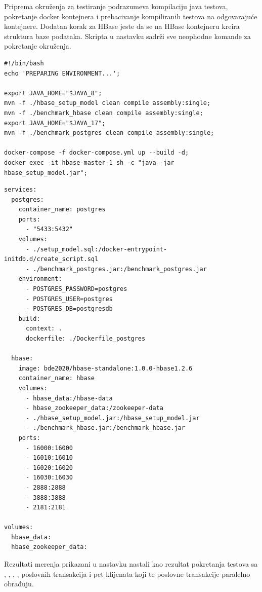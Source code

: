 \documentclass[12pt,oneside]{memoir}
\begin{document}
Priprema okruženja za testiranje podrazumeva kompilaciju java testova, pokretanje docker kontejnera i prebacivanje kompiliranih testova na odgovarajuće kontejnere. Dodatan korak za HBase jeste da se na HBase kontejneru kreira struktura baze podataka. Skripta u nastavku sadrži sve neophodne komande za pokretanje okruženja.

\pagebreak

\begin{lstlisting}[title={prepare-env.sh},captionpos=t]
#!/bin/bash
echo 'PREPARING ENVIRONMENT...';

export JAVA_HOME="$JAVA_8";
mvn -f ./hbase_setup_model clean compile assembly:single;
mvn -f ./benchmark_hbase clean compile assembly:single;
export JAVA_HOME="$JAVA_17";
mvn -f ./benchmark_postgres clean compile assembly:single;

docker-compose -f docker-compose.yml up --build -d;
docker exec -it hbase-master-1 sh -c "java -jar hbase_setup_model.jar";
\end{lstlisting}

\begin{lstlisting}[title={docker-compose.yml},captionpos=t]
services: 
  postgres:
    container_name: postgres
    ports:
      - "5433:5432"
    volumes:
      - ./setup_model.sql:/docker-entrypoint-initdb.d/create_script.sql
      - ./benchmark_postgres.jar:/benchmark_postgres.jar
    environment:
      - POSTGRES_PASSWORD=postgres
      - POSTGRES_USER=postgres
      - POSTGRES_DB=postgresdb
    build:
      context: .
      dockerfile: ./Dockerfile_postgres

  hbase:
    image: bde2020/hbase-standalone:1.0.0-hbase1.2.6
    container_name: hbase
    volumes:
      - hbase_data:/hbase-data
      - hbase_zookeeper_data:/zookeeper-data
      - ./hbase_setup_model.jar:/hbase_setup_model.jar
      - ./benchmark_hbase.jar:/benchmark_hbase.jar
    ports:
      - 16000:16000
      - 16010:16010
      - 16020:16020
      - 16030:16030
      - 2888:2888
      - 3888:3888
      - 2181:2181

volumes:
  hbase_data:
  hbase_zookeeper_data:
\end{lstlisting}

Rezultati merenja prikazani u nastavku nastali kao rezultat pokretanja testova sa , , , ,  poslovnih transakcija i pet klijenata koji te poslovne transakcije paralelno obrađuju.
\end{document}
